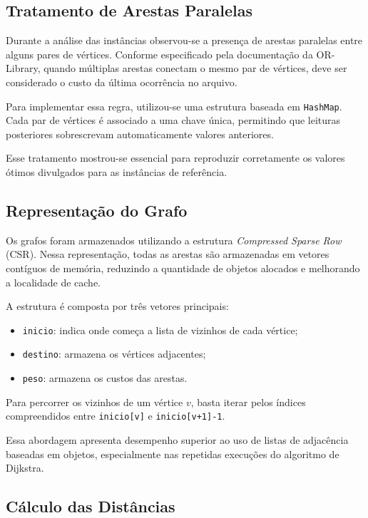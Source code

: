 \documentclass[12pt]{article}
\begin{document}
\subsection{Tratamento de Arestas Paralelas}

Durante a análise das instâncias observou-se a presença de arestas paralelas entre alguns pares de vértices. Conforme especificado pela documentação da OR-Library, quando múltiplas arestas conectam o mesmo par de vértices, deve ser considerado o custo da última ocorrência no arquivo.

Para implementar essa regra, utilizou-se uma estrutura baseada em \texttt{HashMap}. Cada par de vértices é associado a uma chave única, permitindo que leituras posteriores sobrescrevam automaticamente valores anteriores.

Esse tratamento mostrou-se essencial para reproduzir corretamente os valores ótimos divulgados para as instâncias de referência.

\subsection{Representação do Grafo}

Os grafos foram armazenados utilizando a estrutura \textit{Compressed Sparse Row} (CSR). Nessa representação, todas as arestas são armazenadas em vetores contíguos de memória, reduzindo a quantidade de objetos alocados e melhorando a localidade de cache.

A estrutura é composta por três vetores principais:

\begin{itemize}
\item \texttt{inicio}: indica onde começa a lista de vizinhos de cada vértice;
\item \texttt{destino}: armazena os vértices adjacentes;
\item \texttt{peso}: armazena os custos das arestas.
\end{itemize}

Para percorrer os vizinhos de um vértice $v$, basta iterar pelos índices compreendidos entre \texttt{inicio[v]} e \texttt{inicio[v+1]-1}.

Essa abordagem apresenta desempenho superior ao uso de listas de adjacência baseadas em objetos, especialmente nas repetidas execuções do algoritmo de Dijkstra.

\subsection{Cálculo das Distâncias}
\end{document}
